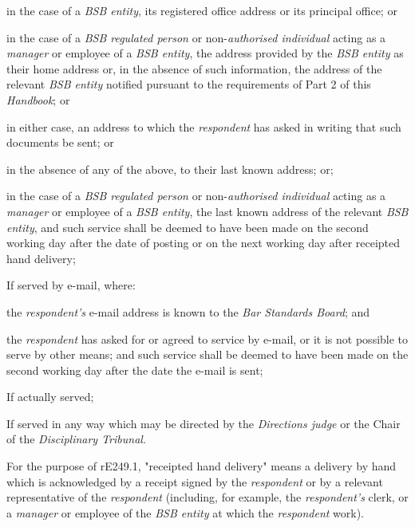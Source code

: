 \item in the case of a \emph{BSB entity}, its registered office address or
its principal office; or\\
\item in the case of a \emph{BSB regulated person} or non-\emph{authorised
individual} acting as a \emph{manager} or employee of a \emph{BSB
entity}, the address provided by the \emph{BSB entity} as their home
address or, in the absence of such information, the address of the
relevant \emph{BSB entity} notified pursuant to the requirements of Part
2 of this \emph{Handbook}; or\\
\item in either case, an address to which the \emph{respondent} has asked
in writing that such documents be sent; or\\
\item in the absence of any of the above, to their last known address;
or;\\
\item in the case of a \emph{BSB regulated person} or non-\emph{authorised
individual} acting as a \emph{manager }or employee of a \emph{BSB
entity}, the last known address of the relevant \emph{BSB entity},\la
and such service shall be deemed to have been made on the second working
day after the date of posting or on the next working day after receipted
hand delivery;\item If served by e-mail, where:\al
\item  the \emph{respondent's} e-mail address is known to the \emph{Bar
Standards Board}; and\\
\item the \emph{respondent} has asked for or agreed to service by e-mail,
or it is not possible to serve by other means;\la
and such service shall be deemed to have been made on the second working
day after the date the e-mail is sent;\item If actually served;\item If served in any way which may be directed by the \emph{Directions
judge} or the Chair of the\emph{ Disciplinary Tribunal}.\ln
{}\par
For the purpose of rE249.1, "receipted hand delivery" means  a delivery
by hand which is acknowledged by a receipt signed by
the \emph{respondent} or by a relevant representative of
the \emph{respondent} (including, for example,
the \emph{respondent's} clerk, or a \emph{manager} or employee of
the \emph{BSB entity} at which the \emph{respondent} work).\\
